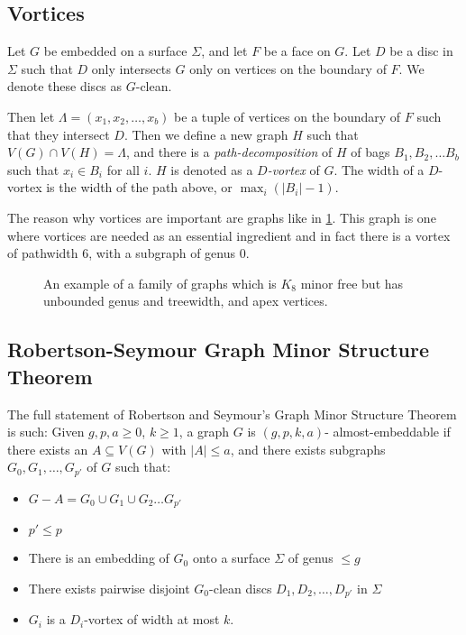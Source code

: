 \subsection{Vortices}\label{sssec:vortices}
Let \(G\) be embedded on a surface \(\Sigma\), and let \(F\) be a face on \(G\). Let \(D\) be a disc in \(\Sigma\) such that \(D\) only intersects \(G\) only on vertices on the boundary of \(F\). We denote these discs as \(G\)-clean. 

Then let \(\Lambda = (x_1, x_2, \ldots, x_b)\) be a tuple of vertices on the boundary of \(F\) such that they intersect \(D\). Then we define a new graph \(H\) such that \(V(G) \cap V(H) = \Lambda\), and there is a \textit{path-decomposition} of \(H\) of bags \(B_1, B_2, \ldots B_b\) such that \(x_i \in B_i\) for all \(i\). \(H\) is denoted as a \textit{\(D\)-vortex} of \(G\). The width of a \(D\)-vortex is the width of the path above, or \(\max_i(|B_i| - 1)\). 

The reason why vortices are important are graphs like in \cref{fig:tenniscourt}. This graph is one where vortices are needed as an essential ingredient and in fact there is a vortex of pathwidth 6, with a subgraph of genus 0.

\begin{figure}[h]
	\centering
	
	\caption{An example of a family of graphs which is \(K_8\) minor free but has unbounded genus and treewidth, and apex vertices. }
	\label{fig:tenniscourt}
\end{figure}
\subsection{Robertson-Seymour Graph Minor Structure Theorem}\label{ssec:Robertson_Seymour_Graph_Structure}
The full statement of Robertson and Seymour's Graph Minor Structure Theorem \cite{robertsonGraphMinorsXVI2003}is such:
Given \(g, p, a \geq 0\), \(k \geq 1\), a graph \(G\) is \((g, p, k, a)\)- almost-embeddable if there exists an \(A \subseteq V(G)\) with \(|A| \leq a\), and there exists subgraphs \(G_0, G_1, \ldots,  G_{p'}\) of \(G\) such that:
\begin{itemize}
	\item \(G - A = G_0 \cup G_1 \cup G_2 \ldots G_{p'}\)
	\item \(p' \leq p\)
	\item There is an embedding of \(G_0\) onto a surface \(\Sigma\) of genus \(\leq g\)
	\item There exists pairwise disjoint \(G_0\)-clean discs \(D_1, D_2, \ldots, D_{p'}\) in \(\Sigma\)
	\item \(G_i\) is a \(D_i\)-vortex of width at most \(k\).
\end{itemize}

